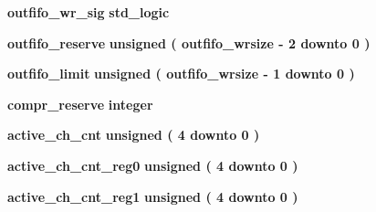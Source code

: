 \begin{DoxyCompactItemize}
\item 
{\bf outfifo\+\_\+wr\+\_\+sig} {\bfseries \textcolor{comment}{std\+\_\+logic}\textcolor{vhdlchar}{ }} 
\item 
{\bf outfifo\+\_\+reserve} {\bfseries \textcolor{comment}{unsigned}\textcolor{vhdlchar}{ }\textcolor{vhdlchar}{(}\textcolor{vhdlchar}{ }\textcolor{vhdlchar}{ }\textcolor{vhdlchar}{ }\textcolor{vhdlchar}{ }{\bfseries {\bf outfifo\+\_\+wrsize}} \textcolor{vhdlchar}{-\/}\textcolor{vhdlchar}{ } \textcolor{vhdldigit}{2} \textcolor{vhdlchar}{ }\textcolor{keywordflow}{downto}\textcolor{vhdlchar}{ }\textcolor{vhdlchar}{ } \textcolor{vhdldigit}{0} \textcolor{vhdlchar}{ }\textcolor{vhdlchar}{)}\textcolor{vhdlchar}{ }} 
\item 
{\bf outfifo\+\_\+limit} {\bfseries \textcolor{comment}{unsigned}\textcolor{vhdlchar}{ }\textcolor{vhdlchar}{(}\textcolor{vhdlchar}{ }\textcolor{vhdlchar}{ }\textcolor{vhdlchar}{ }\textcolor{vhdlchar}{ }{\bfseries {\bf outfifo\+\_\+wrsize}} \textcolor{vhdlchar}{-\/}\textcolor{vhdlchar}{ } \textcolor{vhdldigit}{1} \textcolor{vhdlchar}{ }\textcolor{keywordflow}{downto}\textcolor{vhdlchar}{ }\textcolor{vhdlchar}{ } \textcolor{vhdldigit}{0} \textcolor{vhdlchar}{ }\textcolor{vhdlchar}{)}\textcolor{vhdlchar}{ }} 
\item 
{\bf compr\+\_\+reserve} {\bfseries \textcolor{comment}{integer}\textcolor{vhdlchar}{ }} 
\item 
{\bf active\+\_\+ch\+\_\+cnt} {\bfseries \textcolor{comment}{unsigned}\textcolor{vhdlchar}{ }\textcolor{vhdlchar}{(}\textcolor{vhdlchar}{ }\textcolor{vhdlchar}{ } \textcolor{vhdldigit}{4} \textcolor{vhdlchar}{ }\textcolor{keywordflow}{downto}\textcolor{vhdlchar}{ }\textcolor{vhdlchar}{ } \textcolor{vhdldigit}{0} \textcolor{vhdlchar}{ }\textcolor{vhdlchar}{)}\textcolor{vhdlchar}{ }} 
\item 
{\bf active\+\_\+ch\+\_\+cnt\+\_\+reg0} {\bfseries \textcolor{comment}{unsigned}\textcolor{vhdlchar}{ }\textcolor{vhdlchar}{(}\textcolor{vhdlchar}{ }\textcolor{vhdlchar}{ } \textcolor{vhdldigit}{4} \textcolor{vhdlchar}{ }\textcolor{keywordflow}{downto}\textcolor{vhdlchar}{ }\textcolor{vhdlchar}{ } \textcolor{vhdldigit}{0} \textcolor{vhdlchar}{ }\textcolor{vhdlchar}{)}\textcolor{vhdlchar}{ }} 
\item 
{\bf active\+\_\+ch\+\_\+cnt\+\_\+reg1} {\bfseries \textcolor{comment}{unsigned}\textcolor{vhdlchar}{ }\textcolor{vhdlchar}{(}\textcolor{vhdlchar}{ }\textcolor{vhdlchar}{ } \textcolor{vhdldigit}{4} \textcolor{vhdlchar}{ }\textcolor{keywordflow}{downto}\textcolor{vhdlchar}{ }\textcolor{vhdlchar}{ } \textcolor{vhdldigit}{0} \textcolor{vhdlchar}{ }\textcolor{vhdlchar}{)}\textcolor{vhdlchar}{ }} 

\end{DoxyCompactItemize}
